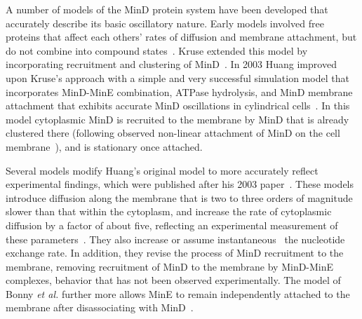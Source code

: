 \documentclass[10pt,letterpaper]{article}
\begin{document}
A number of models of the MinD protein system have been developed that
accurately describe its basic oscillatory nature.
%
Early models involved free proteins that affect each others' rates of
diffusion and membrane attachment, but do not combine into compound
states~\cite{meinhardt2001pattern}.  Kruse extended this model by
incorporating recruitment and clustering of
MinD~\cite{kruse2002dynamic}.  In 2003 Huang improved upon Kruse's
approach with a simple and very successful simulation model that
incorporates MinD-MinE combination, ATPase hydrolysis, and MinD
membrane attachment that exhibits accurate MinD oscillations in
cylindrical cells~\cite{huang2003dynamic}. In this model cytoplasmic
MinD is recruited to the membrane by MinD that is already clustered
there (following observed non-linear attachment of MinD on the cell
membrane~\cite{hu2002dynamic,shih2002division}), and is stationary
once attached.
%

Several models \cite{fange2006noise, bonny2013membrane,
  halatek2012highly} modify Huang's original model to more accurately
reflect experimental findings, which were published after his 2003
paper~\cite{meacci2006mobility, loose2011min}. These models introduce
diffusion along the membrane that is two to three orders of magnitude
slower than that within the cytoplasm, and increase the rate of
cytoplasmic diffusion by a factor of about five, reflecting an
experimental measurement of these
parameters~\cite{meacci2006mobility}.  They also increase
or assume instantaneous~\cite{bonny2013membrane} the nucleotide
exchange rate.  In addition, they revise the process of MinD
recruitment to the membrane, removing recruitment of MinD to the
membrane by MinD-MinE complexes, behavior that has not been observed
experimentally.  The model of Bonny \emph{et al.} further more allows
MinE to remain independently attached to the membrane after
disassociating with MinD~\cite{bonny2013membrane}.
%
\end{document}
